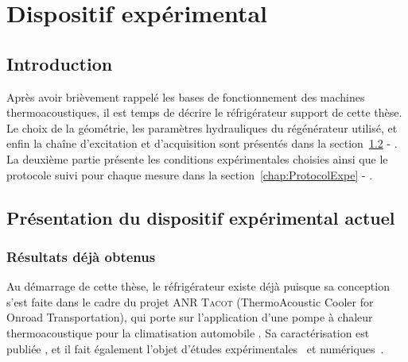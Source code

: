 \chapter{Dispositif expérimental}\label{chap:DispositifExpe}
\mylocaltoc
\newpage

\section{Introduction}\label{chap:IntroProtocExp}
Après avoir brièvement rappelé les bases de fonctionnement des machines thermoacoustiques, il est temps de décrire le réfrigérateur support de cette thèse. Le choix de la géométrie, les paramètres hydrauliques du régénérateur utilisé, et enfin la chaîne d'excitation et d'acquisition sont présentés dans la section~\ref{chap:PresentationTacot} - . La deuxième partie présente les conditions expérimentales choisies ainsi que le protocole suivi pour chaque mesure dans la section~\ref{chap:ProtocolExpe} - .


\section{Présentation du dispositif expérimental actuel}\label{chap:PresentationTacot}

\subsection{Résultats déjà obtenus}\label{chap:PresTacot_ResultatsATE}

Au démarrage de cette thèse, le réfrigérateur existe déjà puisque sa conception s'est faite dans le cadre du projet ANR \textsc{Tacot} (ThermoAcoustic Cooler for Onroad Transportation), qui porte sur l'application d'une pompe à chaleur thermoacoustique pour la climatisation automobile \cite{ANR_thermo-acoustic_2019}. Sa caractérisation est publiée \cite{ramadan_design_2021}, et il fait également l'objet d'études expérimentales~\cite{ramadan_experimental_2018, ramadan_experimental_2021, poignand_test-bench_2022}  et  numériques~\cite{hireche_numerical_2019, hireche_experimental_2020, baltean_gravity_2025}. 

